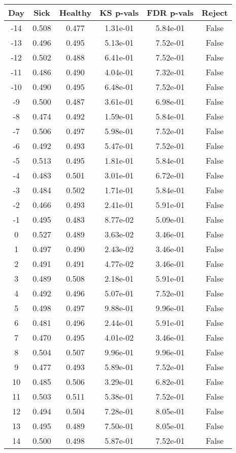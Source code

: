 \begin{tabular}{c|c|c|c|c|c}
Day &  Sick & Healthy &  KS p-vals & FDR p-vals & Reject\\
\hline
-14 & 0.508 &   0.477 &   1.31e-01 &   5.84e-01 &  False\\
-13 & 0.496 &   0.495 &   5.13e-01 &   7.52e-01 &  False\\
-12 & 0.502 &   0.488 &   6.41e-01 &   7.52e-01 &  False\\
-11 & 0.486 &   0.490 &   4.04e-01 &   7.32e-01 &  False\\
-10 & 0.490 &   0.495 &   6.48e-01 &   7.52e-01 &  False\\
 -9 & 0.500 &   0.487 &   3.61e-01 &   6.98e-01 &  False\\
 -8 & 0.474 &   0.492 &   1.59e-01 &   5.84e-01 &  False\\
 -7 & 0.506 &   0.497 &   5.98e-01 &   7.52e-01 &  False\\
 -6 & 0.492 &   0.493 &   5.47e-01 &   7.52e-01 &  False\\
 -5 & 0.513 &   0.495 &   1.81e-01 &   5.84e-01 &  False\\
 -4 & 0.483 &   0.501 &   3.01e-01 &   6.72e-01 &  False\\
 -3 & 0.484 &   0.502 &   1.71e-01 &   5.84e-01 &  False\\
 -2 & 0.466 &   0.493 &   2.41e-01 &   5.91e-01 &  False\\
 -1 & 0.495 &   0.483 &   8.77e-02 &   5.09e-01 &  False\\
  0 & 0.527 &   0.489 &   3.63e-02 &   3.46e-01 &  False\\
  1 & 0.497 &   0.490 &   2.43e-02 &   3.46e-01 &  False\\
  2 & 0.491 &   0.491 &   4.77e-02 &   3.46e-01 &  False\\
  3 & 0.489 &   0.508 &   2.18e-01 &   5.91e-01 &  False\\
  4 & 0.492 &   0.496 &   5.07e-01 &   7.52e-01 &  False\\
  5 & 0.498 &   0.497 &   9.88e-01 &   9.96e-01 &  False\\
  6 & 0.481 &   0.496 &   2.44e-01 &   5.91e-01 &  False\\
  7 & 0.470 &   0.495 &   4.01e-02 &   3.46e-01 &  False\\
  8 & 0.504 &   0.507 &   9.96e-01 &   9.96e-01 &  False\\
  9 & 0.477 &   0.493 &   5.89e-01 &   7.52e-01 &  False\\
 10 & 0.485 &   0.506 &   3.29e-01 &   6.82e-01 &  False\\
 11 & 0.503 &   0.511 &   5.38e-01 &   7.52e-01 &  False\\
 12 & 0.494 &   0.504 &   7.28e-01 &   8.05e-01 &  False\\
 13 & 0.495 &   0.489 &   7.50e-01 &   8.05e-01 &  False\\
 14 & 0.500 &   0.498 &   5.87e-01 &   7.52e-01 &  False\\
\end{tabular}